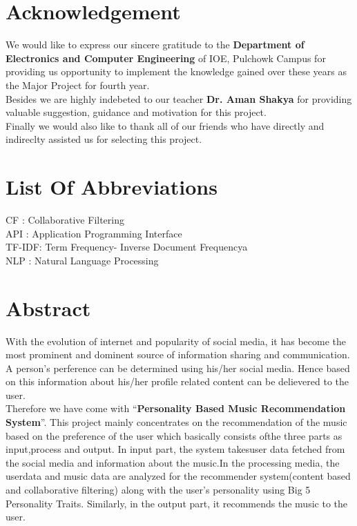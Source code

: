 \documentclass[a4paper,12pt]{article}
\begin{document}
\setcounter{page}{2}

\section*{Acknowledgement}
	We would like to express our sincere gratitude to the \textbf{Department of Electronics and Computer Engineering }of IOE, Pulchowk Campus for providing us opportunity to implement the knowledge gained over these years as the Major Project for fourth year.\\ 
	Besides we are highly indebeted to our teacher \textbf{Dr. Aman Shakya} for providing valuable suggestion, guidance and motivation for this project.\\
Finally we would also like to thank all of our friends who have directly and indireclty assisted us for selecting this project.
\cleardoublepage

\tableofcontents
\thispagestyle{empty}
\cleardoublepage


\listoffigures
\thispagestyle{empty}
\cleardoublepage

\section*{List Of Abbreviations}
\thispagestyle{empty}
CF : Collaborative Filtering\\
API : Application Programming Interface\\
TF-IDF: Term Frequency- Inverse Document Frequencya\\
NLP : Natural Language Processing\\
\cleardoublepage

\section*{Abstract}
With the evolution of internet and popularity of social media, it has become the most prominent and dominent source of information sharing and communication. A person's perference can be determined using his/her social media. Hence based on this information about his/her profile related content can be delievered to the user.\\
Therefore we have come with ``\textbf{Personality Based Music Recommendation System}''. This project mainly concentrates on the recommendation of the music based on the preference of the user which basically consists ofthe three parts as input,process and output. In input part, the system takesuser data fetched from the social media and information about the music.In the processing media, the userdata and music data are analyzed for the recommender system(content based and collaborative filtering) along with the user's personality using Big 5 Personality Traits. Similarly, in the output part, it recommends the music to the user.
\thispagestyle{empty}
\cleardoublepage
{}
\end{document}
